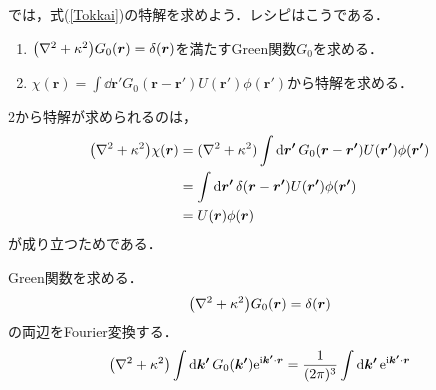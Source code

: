 \documentclass{report}
\begin{document}
  では，式(\ref{Tokkai})の特解を求めよう．レシピはこうである．
  \begin{enumerate}
    \item $\qty(\nabla^2 + \kappa^2)G_0(\bm{r}) = \delta(\bm{r})$を満たすGreen関数$G_0$を求める．
    \item $\chi(\bm{r}) = \int \dd{\bm{r'}} G_0(\bm{r} - \bm{r'}) U(\bm{r'}) \phi(\bm{r'})$から特解を求める．
  \end{enumerate}
  2から特解が求められるのは，
  \begin{align}
    \qty(\nabla^2 + \kappa^2)\chi(\bm{r}) &= (\nabla^2 + \kappa^2)\int \dd{\bm{r'}} G_0(\bm{r} - \bm{r'}) U(\bm{r'}) \phi(\bm{r'})\\
    &= \int \dd{\bm{r'}} \delta(\bm{r} - \bm{r'}) U(\bm{r'}) \phi(\bm{r'})\\
    &= U(\bm{r}) \phi(\bm{r})
  \end{align}
  が成り立つためである．

  Green関数を求める．
  \begin{align}
    \qty(\nabla^2 + \kappa^2)G_0(\bm{r}) = \delta(\bm{r})
  \end{align}
  の両辺をFourier変換する．
  \begin{align}
    \qty(\nabla^2 + \kappa^2)\int \dd{\bm{k'}} G_0(\bm{k'}) \mathrm{e}^{\mathrm{i}\bm{k'}\cdot \bm{r}} = \frac{1}{(2\pi)^3}\int \dd{\bm{k'}} \mathrm{e}^{\mathrm{i}\bm{k'}\cdot\bm{r}}
  \end{align}
\end{document}
